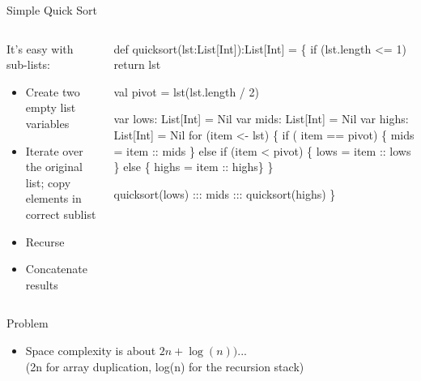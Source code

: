 \begin{frame}[fragile]{Simple Quick Sort}
  \begin{columns}
    \begin{column}{.44\linewidth}
      \begin{block}{It's easy with sub-lists:}
        \begin{itemize}
        \item Create two empty list variables
        \item Iterate over the original list;
          copy elements in correct sublist
        \item Recurse
        \item Concatenate results
        \end{itemize}
      \end{block}
    \end{column}
    \begin{column}{.55\linewidth}
    \begin{boitecode}{}
def quicksort(lst:List[Int]):List[Int] = \{
  if (lst.length <= 1) 
    return lst
  
  val pivot = lst(lst.length / 2)      

  var lows: List[Int] = Nil
  var mids: List[Int] = Nil
  var highs: List[Int] = Nil
  for (item <- lst) \{ 
    if ( item == pivot)    \{ mids  = item :: mids \}
    else if (item < pivot) \{ lows  = item :: lows \}
    else                   \{ highs = item :: highs\}
  \}

  quicksort(lows) ::: mids ::: quicksort(highs) 
\}      
    \end{boitecode}      
    \end{column}
  \end{columns}

  \begin{block}{Problem}
    \begin{itemize}
    \item Space complexity is about $2n+\log(n))$...\\
      {\small (2n for array duplication, log(n) for the recursion stack)}
    \end{itemize}
  \end{block}
\end{frame}
